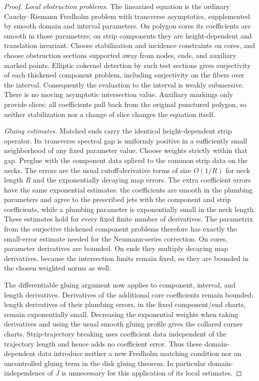 \documentclass[11pt]{article}
\numberwithin{equation}{section}
\theoremstyle{definition}
\theoremstyle{remark}
\begin{document}
\begin{proof}
\emph{Local obstruction problems.}
The linearized equation is the ordinary Cauchy--Riemann Fredholm
problem with transverse asymptotics, supplemented by smooth
domain and interval parameters.  On polygon cores its coefficients
are smooth in those parameters; on strip components they are
height-dependent and translation invariant.  Choose stabilization
and incidence constraints on cores, and choose obstruction
sections supported away from nodes, ends, and auxiliary marked
points.  Elliptic cokernel detection by such test sections gives
surjectivity of each thickened component problem, including
surjectivity on the fibers over the interval.  Consequently the
evaluation to the interval is weakly submersive.  There is no
moving asymptotic intersection value.  Auxiliary markings only
provide slices: all coefficients pull back from the original
punctured polygon, so neither stabilization nor a change of slice
changes the equation itself.

\emph{Gluing estimates.}
Matched ends carry the identical height-dependent strip operator.
Its transverse spectral gap is uniformly positive in a sufficiently
small neighborhood of any fixed parameter value.  Choose weights
strictly within that gap.  Preglue with the component data spliced
to the common strip data on the necks.  The errors are the usual
cutoff-derivative terms of size $O(1/R)$ for neck length $R$ and
the exponentially decaying map errors.  The extra coefficient
errors have the same exponential estimates: the coefficients
are smooth in the plumbing parameters and agree to the prescribed
jets with the component and strip coefficients, while a plumbing
parameter is exponentially small in the neck length.  These
estimates hold for every fixed finite number of derivatives.
The parametrix from the surjective thickened component problems
therefore has exactly the small-error estimate needed for the
Neumann-series correction.  On cores, parameter derivatives are
bounded.  On ends they multiply decaying map derivatives, because
the intersection limits remain fixed, so they are bounded in the
chosen weighted norms as well.

The differentiable gluing argument now applies to component,
interval, and length derivatives.  Derivatives of the additional
core coefficients remain bounded; length derivatives of their
plumbing errors, in the fixed component/end charts, remain
exponentially small.  Decreasing the exponential weights when
taking derivatives and using the usual smooth gluing profile
gives the collared corner charts.  Strip-trajectory breaking uses
coefficient data independent of the trajectory length and hence
adds no coefficient error.  Thus these domain-dependent data
introduce neither a new Fredholm matching condition nor an
uncontrolled gluing term in the disk gluing theorem.  In
particular domain-independence of $J$ is unnecessary for this
application of its local estimates.


\end{proof}
\end{document}
